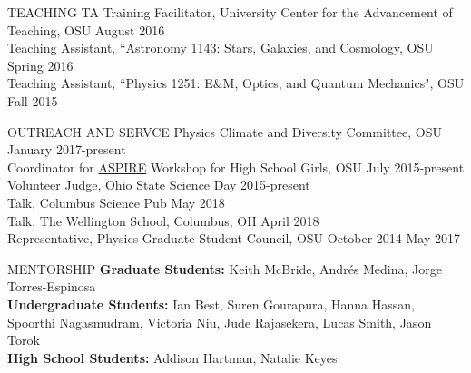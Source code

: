 \documentclass{resume} %
\begin{document}
\begin{rSection}{TEACHING}
TA Training Facilitator, University Center for the Advancement of Teaching, OSU \hfill {August 2016}\\
Teaching Assistant, ``Astronomy 1143: Stars, Galaxies, and Cosmology, OSU \hfill {Spring 2016}\\
Teaching Assistant, ``Physics 1251: E\&M, Optics, and Quantum Mechanics", OSU \hfill {Fall 2015}\\
\end{rSection}
\vspace{-0.35cm}
\begin{rSection}{OUTREACH AND SERVCE}
Physics Climate and Diversity Committee, OSU \hfill January 2017-present\\
Coordinator for \href{u.osu.edu/aspire}{ASPIRE} Workshop for High School Girls, OSU \hfill July 2015-present\\
Volunteer Judge, Ohio State Science Day \hfill 2015-present\\
Talk, Columbus Science Pub \hfill  May 2018\\
Talk, The Wellington School, Columbus, OH \hfill April 2018\\
Representative, Physics Graduate Student Council, OSU \hfill October 2014-May 2017 \\
\end{rSection}
\vspace{-0.30cm}

\newpage
\begin{rSection}{MENTORSHIP}
{\bf Graduate Students:} Keith McBride, Andr\'es Medina, Jorge Torres-Espinosa\\
{\bf Undergraduate Students:}  Ian Best, Suren Gourapura, Hanna Hassan, Spoorthi Nagasmudram, Victoria Niu, Jude Rajasekera, Lucas Smith, Jason Torok \\
{\bf High School Students:} Addison Hartman, Natalie Keyes\\
\end{rSection}
\end{document}
